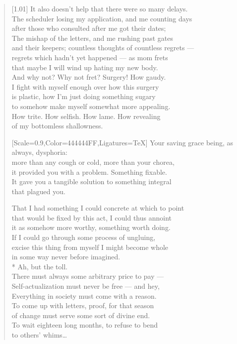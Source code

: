 \begin{verse}[1.01\textwidth]
  It also doesn't help that there were so many delays.\\
  The scheduler losing my application, and me counting days\\
  after those who consulted after me got their dates;\\
  The mishap of the letters, and me rushing past gates\\
  and their keepers; countless thoughts of countless regrets ---\\
  regrets which hadn't yet happened --- as mom frets\\
  that maybe I will wind up hating my new body.\\
  And why not? Why not fret? Surgery! How gaudy.\\
  I fight with myself enough over how this surgery\\
  is plastic, how I'm just doing something sugary\\
  to somehow make myself somewhat more appealing.\\
  How trite. How selfish. How lame. How revealing\\
  of my bottomless shallowness.

  {[Scale=0.9,Color=444444FF,Ligatures=TeX]
  \vin Your saving grace being, as always, dysphoria:\\
  \vin more than any cough or cold, more than your chorea,\\
  \vin it provided you with a problem. Something fixable.\\
  \vin It gave you a tangible solution to something integral\\
  \vin that plagued you.}

  That I had something I could concrete at which to point\\
  that would be fixed by this act, I could thus annoint\\
  it as somehow more worthy, something worth doing.\\
  If I could go through some process of ungluing,\\
  excise this thing from myself I might become whole\\
  in some way never before imagined.\\*
   Ah, but the toll.\\
  There must always some arbitrary price to pay ---\\
  Self-actualization must never be free --- and hey,\\
  Everything in society must come with a reason.\\
  To come up with letters, proof, for that season\\
  of change must serve some sort of divine end.\\
  To wait eighteen long months, to refuse to bend\\
  to others' whims\ldots{}
  \newpage


\end{verse}
